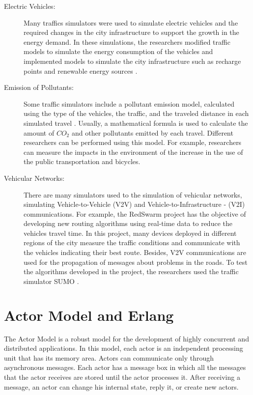 \begin{description}

\item[Electric Vehicles:] Many traffics simulators were used to simulate electric vehicles and the required changes in the city infrastructure to support the growth in the energy demand. In these simulations, the researchers modified traffic models to simulate the energy consumption of the vehicles and implemented models to simulate the city infrastructure such as recharge points and renewable energy sources \citep{allan2015benchmark,geske2010modeling}. 

\item[Emission of Pollutants:] Some traffic simulators include a pollutant emission model, calculated using the type of the vehicles, the traffic, and the traveled distance in each simulated travel \citep{xia2005modelling,hulsmann2014modelling,krajzewicz2012recent,zhou2015integrating}. Usually, a mathematical formula is used to calculate the amount of $CO_2$ and other pollutants emitted by each travel. Different researchers can be performed using this model. For example, researchers can measure the impacts in the environment of the increase in the use of the public transportation and bicycles.
 
\item[Vehicular Networks:]  There are many simulators used to the simulation of vehicular networks, simulating Vehicle-to-Vehicle (V2V) and Vehicle-to-Infrastructure - (V2I) communications. For example, the RedSwarm project \citep{stolfi2014red} has the objective of developing new routing algorithms using real-time data to reduce the vehicles travel time. In this project, many devices deployed in different regions of the city measure the traffic conditions and communicate with the vehicles indicating their best route. Besides, V2V communications are used for the propagation of messages about problems in the roads. To test the algorithms developed in the project, the researchers used the traffic simulator SUMO \citep{behrisch2011sumo}.


\end{description}

\section{Actor Model and Erlang}
\label{sec:modeloAtores}

The Actor Model \citep {de2014dealing} is a robust model for the development of highly concurrent and distributed applications. In this model, each actor is an independent processing unit that has its memory area. Actors can communicate only through asynchronous messages. Each actor has a message box in which all the messages that the actor receives are stored until the actor processes it. After receiving a message, an actor can change his internal state, reply it, or create new actors.

